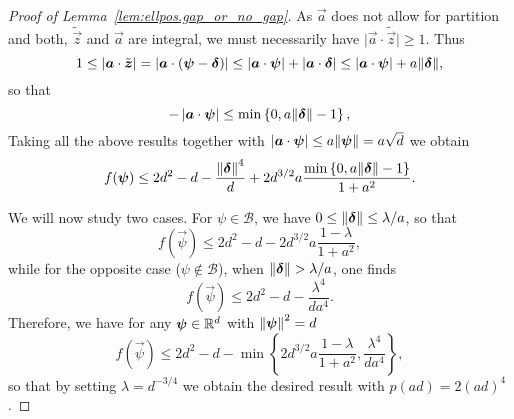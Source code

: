\begin{proof}[Proof of Lemma~\ref{lem:ellpos.gap_or_no_gap}]
  As $\vec a$ does not allow for partition and both, $\tilde{\vec z}$ and $\vec a$ are integral, we must necessarily have $\vert \vec a \cdot \tilde{\vec z} \vert \geq 1$. Thus
  \[
    1\leq\left|\boldsymbol{a}\cdot\tilde{{\boldsymbol{z}}}\right|=\left|\boldsymbol{a}\cdot\left(\boldsymbol{\psi}-\boldsymbol{\delta}\right)\right|\leq\left|\boldsymbol{a}\cdot\boldsymbol{\psi}\right|+\left|\boldsymbol{a}\cdot\boldsymbol{\delta}\right|\leq\left|\boldsymbol{a}\cdot\boldsymbol{\psi}\right|+a{\Vert\boldsymbol{\delta}\Vert},
  \]
  so that
  \[
    -\left|\boldsymbol{a}\cdot\boldsymbol{\psi}\right|\leq\min\left\{0,a{\Vert\boldsymbol{\delta}\Vert}-1\right\},
  \]
  Taking all the above results together with $\left|\boldsymbol{a}\cdot\boldsymbol{\psi}\right|\leq a{\Vert\boldsymbol{\psi}\Vert}=a\sqrt{d}$ we obtain
  \[
    f({\boldsymbol{\psi}})\leq 2d^{2}-d-\frac{{\Vert{\boldsymbol{\delta}}\Vert}^4}{d}+2 d^{3/2}a\frac{\min\left\{0,a{\Vert\boldsymbol{\delta}\Vert}-1\right\}}{1+a^{2}}.
  \]

  We will now study two cases. For $\psi \in \mathcal{B}$, we have $0\leq{\Vert{\boldsymbol{\delta}}\Vert}\leq\lambda/a$, so that
  \[
    f(\vec \psi)\leq 2d^{2}-d-2 d^{3/2}a\frac{1-\lambda}{1+a^{2}},
  \]
  while for the opposite case ($\psi \notin \mathcal{B}$), when  ${\Vert{\boldsymbol{\delta}}\Vert}>\lambda/a$, one finds
  \[
    f(\vec \psi)\leq 2d^{2}-d-\frac{\lambda^4}{d a^4}.
  \]
  Therefore, we have for any ${\boldsymbol{\psi}} \in {\mathbb{R}}^d$ with ${\Vert{\boldsymbol{\psi}}\Vert}^2 = d$
  \[
    f(\vec \psi)\leq 2d^{2}-d- \min\left\{2 d^{3/2}a\frac{1-\lambda}{1+a^{2}},\frac{\lambda^4}{d a^4}\right\},
  \]
  so that by setting $\lambda=d^{-3/4}$ we obtain the desired result with $p(ad)=2{(ad)}^4$.
\end{proof}


